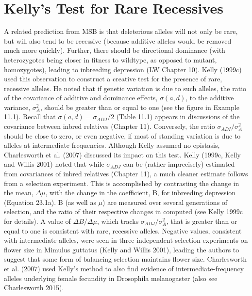 \documentclass{article}
\begin{document}
\section{Kelly's Test for Rare Recessives}
A related prediction from MSB is that deleterious alleles will not only be rare, but will also tend to be recessive (because additive alleles would be removed much more quickly). Further, there should be directional dominance (with heterozygotes being closer in fitness to wildtype, as opposed to mutant, homozygotes), leading to inbreeding depression (LW Chapter 10). Kelly (1999c) used this observation to construct a creative test for the presence of rare, recessive alleles. He noted that if genetic variation is due to such alleles, the ratio of the covariance of additive and dominance effects,  $ \sigma(a, d) $, to the additive variance,  $ \sigma_A^2 $, should be greater than or equal to one (see the figure in Example 11.1). Recall that  $ \sigma(a, d) = \sigma_{ADJ}/2 $ (Table 11.1) appears in discussions of the covariance between inbred relatives (Chapter 11). Conversely, the ratio  $ \sigma_{ADI}/\sigma_A^2 $ should be close to zero, or even negative, if most of standing variation is due to alleles at intermediate frequencies. Although Kelly assumed no epistasis, Charlesworth et al. (2007) discussed its impact on this test. Kelly (1999c, Kelly and Willis 2001) noted that while  $ \sigma_{ADJ} $ can be (rather imprecisely) estimated from covariances of inbred relatives (Chapter 11), a much cleaner estimate follows from a selection experiment. This is accomplished by contrasting the change in the mean,  $ \Delta\mu $, with the change in the coefficient, B, for inbreeding depression (Equation 23.1a). B (as well as  $ \mu $) are measured over several generations of selection, and the ratio of their respective changes in computed (see Kelly 1999c for details). A value of  $ \Delta B/\Delta\mu $, which tracks  $ \sigma_{ADJ}/\sigma_A^2 $, that is greater than or equal to one is consistent with rare, recessive alleles. Negative values, consistent with intermediate alleles, were seen in three independent selection experiments on flower size in Mimulus guttatus (Kelly and Willis 2001), leading the authors to suggest that some form of balancing selection maintains flower size. Charlesworth et al. (2007) used Kelly's method to also find evidence of intermediate-frequency alleles underlying female fecundity in Drosophila melanogaster (also see Charlesworth 2015).
\end{document}

